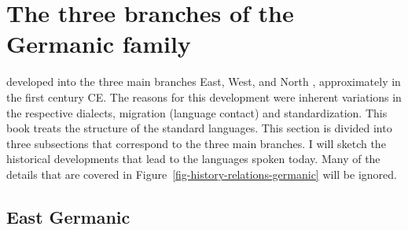 




\section{The three branches of the Germanic family}

 developed into the three main branches East, West, and North , approximately in
the first century CE. The reasons for this development were inherent variations in the respective
dialects, migration (language contact) and standardization. This book treats the structure of the
 standard languages. This section is divided into three subsections that correspond to the
three main  branches. I will sketch the historical developments that lead to the
languages spoken today. Many of the details that are covered in Figure~\ref{fig-history-relations-germanic} will be ignored.



\subsection{East Germanic}

